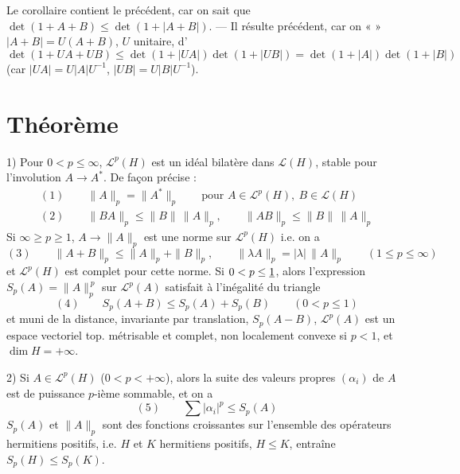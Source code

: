 \documentclass[11pt,a4paper]{article}
\begin{document}
Le corollaire contient le précédent, car on sait que $\det(1 + A + B) \leq \det(1 + |A + B|)$. --- Il résulte  précédent, car on  «   »  $|A + B| = U(A + B)$, $U$ unitaire, d'    
\[
  \det(1 + UA + UB) \leq \det(1 + |UA|)\det(1 + |UB|) = \det(1 + |A|)\det(1 + |B|)
\]
(car $|UA| = U|A|U^{-1}$, $|UB| = U|B|U^{-1}$).
\struck{\ill{}} 

\section*{Théorème}

1) Pour \struck{\ill{}} $0 < p \leq \infty$, $\mathcal{L}^p(H)$ est un idéal bilatère  dans $\mathcal{L}(H)$, stable pour l'involution $A \to A^*$. De façon précise \struck{\ill{}} :
\begin{gather*}
  (1)\qquad \|A\|_p = \|A^*\|_p \qquad \text{pour } A \in \mathcal{L}^p(H),\ B \in \mathcal{L}(H) \\
  (2)\qquad \|BA\|_p \leq \|B\|\,\|A\|_p, \qquad \|AB\|_p \leq \|B\|\,\|A\|_p
\end{gather*}
 Si $\infty \geq p \geq 1$, $A \to \|A\|_p$ est une norme sur $\mathcal{L}^p(H)$ \marginal{\ill{}} i.e. on a
\[
  (3)\qquad \|A + B\|_p \leq \|A\|_p + \|B\|_p, \qquad \|\lambda A\|_p = |\lambda|\,\|A\|_p \qquad (1 \leq p \leq \infty)
\]
 et $\mathcal{L}^p(H)$ est complet pour cette norme. Si $0 < p \leq \uncertain{1}$, alors l'expression $S_p(A) = \|A\|_p^{\,p}$ sur $\mathcal{L}^p(A)$  satisfait à l'inégalité du triangle
\[
  (4)\qquad S_p(A + B) \leq S_p(A) + S_p(B) \qquad (0 < p \leq 1)
\]
et muni de la distance, invariante par translation, $S_p(A - B)$, $\mathcal{L}^p(A)$ est un espace vectoriel top. métrisable et complet, non localement convexe si $p < 1$, et $\dim H = +\infty$.

2) Si $A \in \mathcal{L}^p(H)$ ($0 < p < +\infty$), alors la suite des valeurs propres $(\alpha_i)$  de $A$ est de puissance $p$-ième sommable, et on a
\[
  (5)\qquad \sum |\alpha_i|^p \leq S_p(A)
\]
$S_p(A)$ et $\|A\|_p$ sont des fonctions croissantes sur l'ensemble des opérateurs hermitiens positifs, i.e. $H$ et $K$ hermitiens positifs, $H \leq K$, entraîne $S_p(H) \leq S_p(K)$.
\end{document}
